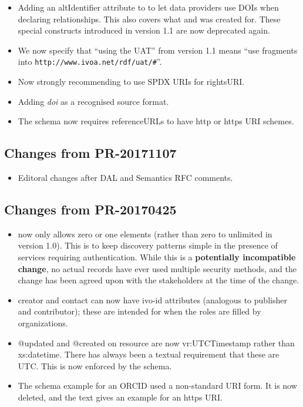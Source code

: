 \documentclass[11pt,a4paper]{ivoa}
\begin{document}
\begin{itemize}
\item Adding an altIdentifier attribute to  to
let  data providers use DOIs when declaring relationships.  This also
covers what  and
 was created for.  These special
constructs introduced in version 1.1 are now deprecated again.

\item We now specify that ``using the UAT'' from version 1.1 means ``use
fragments into \nolinkurl{http://www.ivoa.net/rdf/uat/#}''.

\item Now strongly recommending to use SPDX URIs for rightsURI.

\item Adding \emph{doi} as a recognised source format.

\item The schema now requires referenceURLs to have http or https URI schemes.

\end{itemize}

\subsection{Changes from PR-20171107}

\begin{itemize}
\item Editoral changes after DAL and Semantics RFC comments.
\end{itemize}

\subsection{Changes from PR-20170425}

\begin{itemize}
\item {} now only allows zero or one
 elements (rather than zero to unlimited in
version 1.0).  This is to keep discovery patterns simple in the presence
of services requiring authentication.  While this is a
\textbf{potentially incompatible change}, no actual records have ever
used multiple security methods, and the change has been agreed upon with
the stakeholders at the time of the change.
\item creator and contact can now have ivo-id attributes (analogous
to publisher and contributor); these are intended for when the roles are
filled by organizations.
\item @updated and @created on resource are now vr:UTCTimestamp rather
than xs:datetime.  There has always been a textual requirement that
these are UTC.  This is now enforced by the schema.
\item The schema example for an ORCID used a non-standard URI form.  It
is now deleted, and the text gives an example for an https URI.
\end{itemize}
\end{document}

